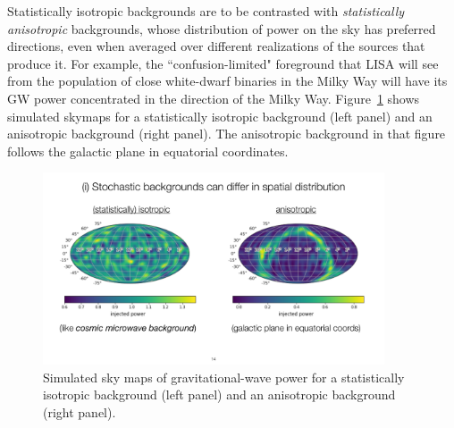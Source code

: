 Statistically isotropic backgrounds are to be contrasted
with {\em statistically anisotropic} backgrounds, 
whose distribution of power on the sky has preferred 
directions, even when averaged over different 
realizations of the sources that produce it.
For example, the ``confusion-limited" foreground that 
LISA will see from the population of close white-dwarf 
binaries in the Milky Way will have its GW
power concentrated in the direction of the Milky Way.
Figure~\ref{f:statiso-vs-aniso} shows simulated skymaps 
for a statistically isotropic background (left panel) and an
anisotropic background (right panel). 
The anisotropic background in that figure follows the
galactic plane in equatorial coordinates. 
%
\begin{figure}[htbp!]
\begin{center}
\includegraphics[width=0.9\textwidth]{Figures/statiso-vs-aniso}
\caption{Simulated sky maps of gravitational-wave power
for a statistically isotropic background (left panel) and an 
anisotropic background (right panel).}
\label{f:statiso-vs-aniso}
\end{center}
\end{figure}
%


